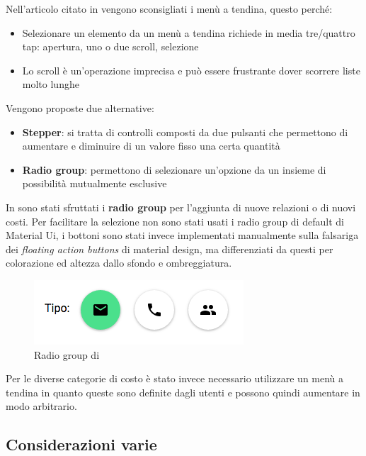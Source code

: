 Nell'articolo citato in \cite{luke-dropdown} vengono sconsigliati i menù a tendina, questo perché:

\begin{itemize}
\item Selezionare un elemento da un menù a tendina richiede in media tre/quattro
tap: apertura, uno o due scroll, selezione
\item Lo scroll è un'operazione imprecisa e può essere frustrante dover scorrere
liste molto lunghe
\end{itemize}

Vengono proposte due alternative:

\begin{itemize}
\item \textbf{Stepper}: si tratta di controlli composti da due pulsanti che permettono
di aumentare e diminuire di un valore fisso una certa quantità
\item \textbf{Radio group}: permettono di selezionare un'opzione da un insieme di
possibilità mutualmente esclusive
\end{itemize}

In \fiscoloMobile{} sono stati sfruttati i \textbf{radio group} per l'aggiunta di nuove
relazioni o di nuovi costi. Per facilitare la selezione non sono stati usati i radio group
di default di Material Ui, i bottoni sono stati invece implementati manualmente sulla falsariga
dei \textit{floating action buttons} di material design, ma differenziati da questi per
colorazione ed altezza dallo sfondo e ombreggiatura.  \\

\begin{figure}[H]\label{imgRadioGroup}
	\centering
	\includegraphics[width=.5\columnwidth]{images/radioGroup.png}
	\caption{Radio group di \fiscoloMobile}
\end{figure}

Per le diverse categorie di costo è stato invece necessario utilizzare un menù a tendina
in quanto queste sono definite dagli utenti e possono quindi aumentare in modo arbitrario.

\subsection{Considerazioni varie}

